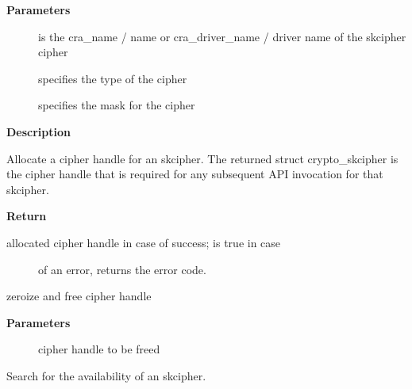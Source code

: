 \documentclass[a4paper,8pt,english]{sphinxmanual}
\begin{document}
\textbf{Parameters}
\begin{description}
\item[{}] \leavevmode
is the cra\_name / name or cra\_driver\_name / driver name of the
skcipher cipher

\item[{}] \leavevmode
specifies the type of the cipher

\item[{}] \leavevmode
specifies the mask for the cipher

\end{description}

\textbf{Description}

Allocate a cipher handle for an skcipher. The returned struct
crypto\_skcipher is the cipher handle that is required for any subsequent
API invocation for that skcipher.

\textbf{Return}
\begin{description}
\item[{allocated cipher handle in case of success;  is true in case}] \leavevmode
of an error,  returns the error code.

\end{description}

\begin{fulllineitems}
\label{crypto/api-skcipher:c.crypto_free_skcipher}
zeroize and free cipher handle

\end{fulllineitems}


\textbf{Parameters}
\begin{description}
\item[{}] \leavevmode
cipher handle to be freed

\end{description}

\begin{fulllineitems}
\label{crypto/api-skcipher:c.crypto_has_skcipher}
Search for the availability of an skcipher.

\end{fulllineitems}
\end{document}
